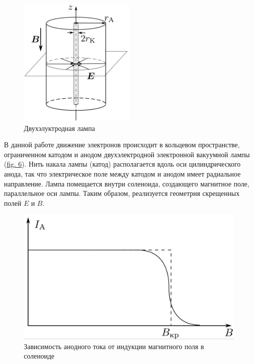 \documentclass[a4paper]{article}
\begin{document}
\begin{figure}[h]
\begin{center}
\includegraphics[width = 0.5\textwidth]{СхемаДвухЭлектроднойЛабы}
\caption{Двухэлуктродная лампа}
\label{2elbulb}
\end{center}
\end{figure}

В данной работе движение электронов происходит в кольцевом про­странстве, ограниченном катодом и анодом двухэлектродной электрон­ной вакуумной лампы (\hyperref[2elbulb]{fig. 6}). Нить накала лампы (катод) располагается вдоль оси цилиндрического анода, так что электрическое поле между катодом и анодом имеет радиальное направление. Лампа помещается внутри соленоида, создающего магнитное поле, параллельное оси лам­пы.
Таким образом, реализуется геометрия скрещенных полей $E$ и $B$.

\begin{figure}[h]
	\begin{center}
		\includegraphics[width = \textwidth]{ЗависимостьТокаотМагнПоля}
		\caption{Зависимость анодного тока от индукции магнитного поля в соленоиде}
	\end{center}
\label{IA(B)}
\end{figure}
\end{document}
